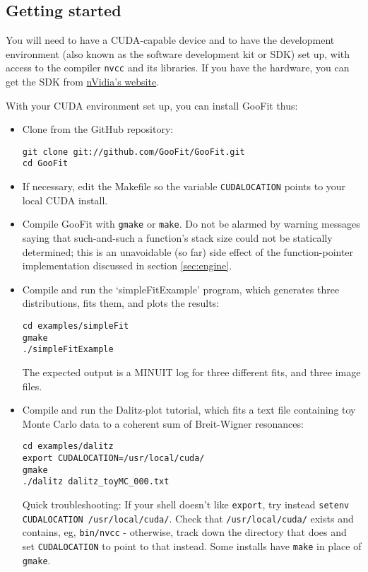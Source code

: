 \documentclass[12pt,pdflatex]{article}
\begin{document}
\subsection{Getting started}

You will need to have a CUDA-capable device and to have the development
environment (also known as the software development kit or SDK) 
set up, with access to the compiler \texttt{nvcc} and its libraries.
If you have the hardware, you can get the SDK 
from \href{https://developer.nvidia.com/gpu-computing-sdk}{nVidia's website}.

With your CUDA environment set up, you can install GooFit thus: 
\begin{itemize}
\item Clone from the GitHub repository:
\begin{verbatim}
git clone git://github.com/GooFit/GooFit.git
cd GooFit
\end{verbatim}
\item If necessary, edit the Makefile so the variable \texttt{CUDALOCATION}
points to your local CUDA install.
\item Compile GooFit with \texttt{gmake} or \texttt{make}. Do not be alarmed
by warning messages saying that such-and-such a function's stack size could
not be statically determined; this is an unavoidable (so far) side effect 
of the function-pointer implementation discussed in section \ref{sec:engine}.
\item Compile and run the `simpleFitExample' program, which generates
three distributions, fits them, and plots the results:
\begin{verbatim}
cd examples/simpleFit
gmake
./simpleFitExample
\end{verbatim}
The expected output is a MINUIT log for three different fits, 
and three image files. 
\item Compile and run the Dalitz-plot tutorial, which fits a 
text file containing toy Monte Carlo data to a coherent sum of
Breit-Wigner resonances: 
\begin{verbatim}
cd examples/dalitz
export CUDALOCATION=/usr/local/cuda/
gmake
./dalitz dalitz_toyMC_000.txt
\end{verbatim}
Quick troubleshooting: If your shell doesn't like \texttt{export},
try instead \verb|setenv CUDALOCATION /usr/local/cuda/|. Check
that \verb|/usr/local/cuda/| exists and contains, eg, \verb|bin/nvcc| - 
otherwise, track down the directory that does and set \verb|CUDALOCATION|
to point to that instead. Some installs have \verb|make| in place of \verb|gmake|. 


\end{itemize}
\end{document}
